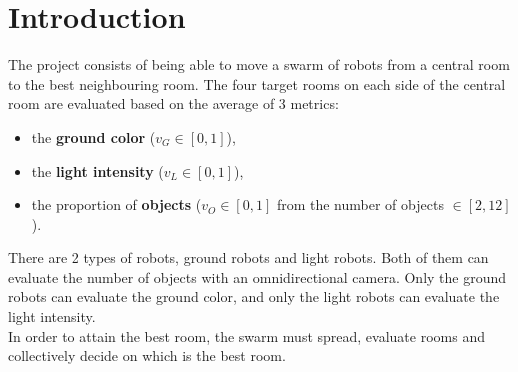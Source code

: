\section{Introduction}

The project consists of being able to move a swarm of robots from a central room
to the best neighbouring room. The four target rooms on each side of the central
room are evaluated based on the average of 3 metrics:

\begin{itemize}
    \item the \textbf{ground color} ($v_G \in [0,1]$),
    \item the \textbf{light intensity} ($v_L \in [0,1]$),
    \item the proportion of \textbf{objects} ($v_O \in [0,1]$ from the number
    of objects
$\in [2,12]$).
\end{itemize}

\noindent There are 2 types of robots, ground robots and light robots. Both of
them can evaluate the number of objects with an omnidirectional camera. Only the
ground robots can evaluate the ground color, and only the light robots can
evaluate the light intensity.\\

\noindent In order to attain the best room, the swarm must spread, evaluate rooms and
collectively decide on which is the best room.
